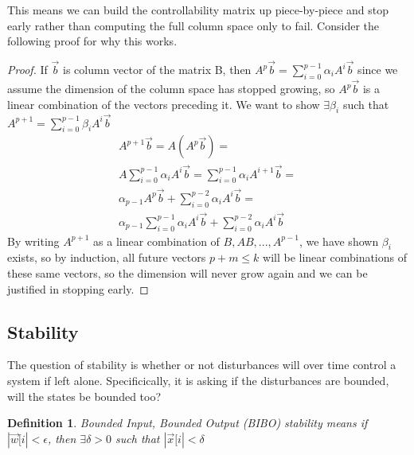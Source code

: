 \documentclass{article}
\newtheorem{definition}{Definition}
\newtheorem{proof}{Proof}
\begin{document}
This means we can build the controllability matrix up piece-by-piece and stop early rather than computing the full column space only to fail. Consider the following proof for why this works.
\begin{proof}
    If $\vec{b}$ is column vector of the matrix B, then $A^p \vec{b}=\sum_{i=0}^{p-1}{\alpha_iA^i\vec{b}}$ since we assume the dimension of the column space has stopped growing,
    so $A^p\vec{b}$ is a linear combination of the vectors preceding it.
    We want to show $\exists \beta_i$ such that $A^{p+1}=\sum_{i=0}^{p-1}{\beta_iA^i\vec{b}}$
    \[
        \begin{array}{c}
            A^{p+1}\vec{b}=A(A^p\vec{b}) =\\
            A\sum_{i=0}^{p-1}{\alpha_iA^i\vec{b}} = \sum_{i=0}^{p-1}{\alpha_iA^{i+1}\vec{b}}=\\
            \alpha_{p-1}A^p\vec{b}+ \sum_{i=0}^{p-2}{\alpha_iA^{i}\vec{b}}=\\
            \alpha_{p-1}\sum_{i=0}^{p-1}{\alpha_iA^i\vec{b}}+\sum_{i=0}^{p-2}{\alpha_iA^{i}\vec{b}}
        \end{array}
        \]
    By writing $A^{p+1}$ as a linear combination of $B, AB,...,A^{p-1}$, we have shown $\beta_i$ exists, so by induction, all future vectors $p+m\leq k$ will be linear combinations of these same vectors, 
    so the dimension will never grow again and we can be justified in stopping early.
\end{proof}
\subsection{Stability}
The question of stability is whether or not disturbances will over time control a system if left alone.
Specificically, it is asking if the disturbances are bounded, will the states be bounded too?
\begin{definition}
    Bounded Input, Bounded Output (BIBO) stability means if $|\vec{w}[i| < \epsilon$, then $\exists \delta>0$ such that $|\vec{x}[i| < \delta$
\end{definition}
\end{document}
